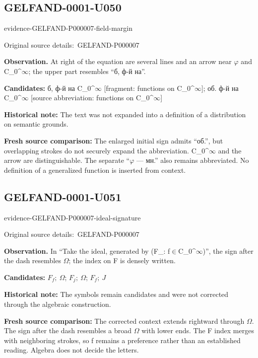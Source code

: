 \documentclass[11pt]{article}
\newcommand{\EvidenceBlock}[4]{%
 \par\smallskip\noindent\begin{minipage}{\linewidth}
 \begin{minipage}[t]{.47\linewidth}\vspace{0pt}\centering
 \csname evidence-#1-#2\endcsname\par
 {\scriptsize\SourceCropCaption\ #1}\par
 \end{minipage}\hfill
 \begin{minipage}[t]{.49\linewidth}\vspace{0pt}\raggedright
 {\small\color{orange!65!black}\textbf{#4} #3}\par
 \end{minipage}
 \end{minipage}\par\smallskip}
\newcommand{\SourceCropCaption}{Original source details:}\newcommand{\ReadingCaption}{Uncertain reading.}\newcommand{\IncompleteCaption}{Undeciphered passage.}\newcommand{\DiagramCaption}{Diagram and typed description.}
\begin{document}
\subsection*{GELFAND-0001-U050}
\EvidenceBlock{GELFAND-P000007}{field-margin}{At right of the equation are several lines and an arrow near \(\varphi\) and C\_0\textasciicircum{}\(\infty\); the upper part resembles “б, ф-й на”.}{Observation.}
\par\smallskip\noindent\textbf{Candidates: } б, ф-й на C\_0\textasciicircum{}\(\infty\) [fragment: functions on C\_0\textasciicircum{}\(\infty\)]; об. ф-й на C\_0\textasciicircum{}\(\infty\) [source abbreviation: functions on C\_0\textasciicircum{}\(\infty\)]\par
\par\smallskip\noindent\textbf{Historical note: } The text was not expanded into a definition of a distribution on semantic grounds.\par
\par\smallskip\noindent\textbf{Fresh source comparison: } The enlarged initial sign admits “об.”, but overlapping strokes do not securely expand the abbreviation. C\_0\textasciicircum{}\(\infty\) and the arrow are distinguishable. The separate “\(\varphi\) — мн.” also remains abbreviated. No definition of a generalized function is inserted from context.\par

\subsection*{GELFAND-0001-U051}
\EvidenceBlock{GELFAND-P000007}{ideal-signature}{In “Take the ideal, generated by (F\_: f\(\in\)C\_0\textasciicircum{}\(\infty\))”, the sign after the dash resembles \(\Omega\); the index on F is densely written.}{Observation.}
\par\smallskip\noindent\textbf{Candidates: } \(F_f;\ \Omega\); \(F_j;\ \Omega\); \(F_f;\ J\)\par
\par\smallskip\noindent\textbf{Historical note: } The symbols remain candidates and were not corrected through the algebraic construction.\par
\par\smallskip\noindent\textbf{Fresh source comparison: } The corrected context extends rightward through \(\Omega\). The sign after the dash resembles a broad \(\Omega\) with lower ends. The F index merges with neighboring strokes, so f remains a preference rather than an established reading. Algebra does not decide the letters.\par
\end{document}
